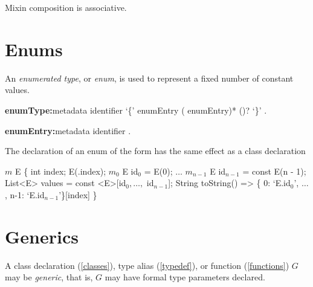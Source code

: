 \documentclass{article}
\begin{document}
\LMHash{}
Mixin composition is associative.



\section{Enums}

\LMHash{}
An {\em enumerated type}, or {\em enum}, is used to represent a fixed number of constant values.

\begin{grammar}
{\bf enumType:}metadata \ENUM{} identifier
  \gnewline{} `\{' enumEntry (\gcomma{} enumEntry)* (\gcomma{})? `\}'
  .

{\bf enumEntry:}metadata identifier
  .
\end{grammar}

\LMHash{}
The declaration of an enum of the form
has the same effect as a class declaration

\begin{dartCode}
$m$ \CLASS{} E \{
  \FINAL{} int index;
  \CONST{} E(\THIS{}.index);
  $m_0$ \STATIC{} \CONST{} E id$_0$ = \CONST{} E(0);
  $\ldots$
  $m_{n-1}$ \STATIC{} \CONST{} E id$_{n-1}$ = const E(n - 1);
  \STATIC{} \CONST{} List<E> values = const <E>[id$_0, \ldots, $ id$_{n-1}$];
  String toString() => \{ 0: `E.id$_0$', $\ldots$, n-1: `E.id$_{n-1}$'\}[index]
\}
\end{dartCode}



\section{Generics}

\LMHash{}
A class declaration (\ref{classes}), type alias (\ref{typedef}), or function (\ref{functions}) $G$ may be {\em generic}, that is, $G$ may have formal type parameters declared.
\end{document}

